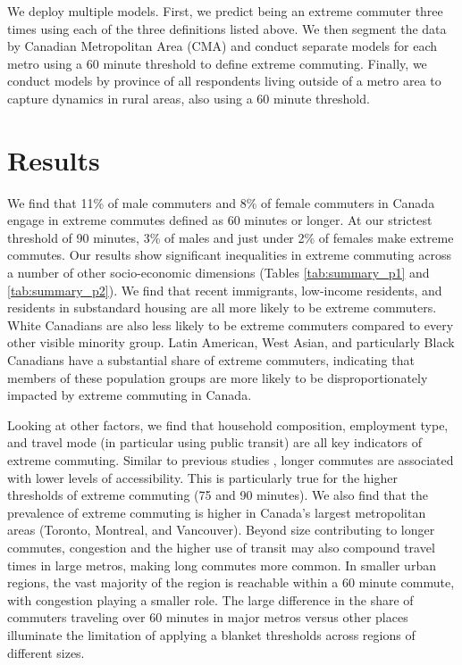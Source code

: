 \documentclass[10 pt,letterpaper]{article}
\begin{document}
We deploy multiple models. First, we predict being an extreme commuter three times using each of the three definitions listed above. We then segment the data by Canadian Metropolitan Area (CMA) and conduct separate models for each metro using a 60 minute threshold to define extreme commuting. Finally, we conduct models by province of all respondents living outside of a metro area to capture dynamics in rural areas, also using a 60 minute threshold.



\section{Results}

We find that 11\% of male commuters and 8\% of female commuters in Canada engage in extreme commutes defined as 60 minutes or longer. At our strictest threshold of 90 minutes, 3\% of males and just under 2\% of females make extreme commutes. Our results show significant inequalities in extreme commuting across a number of other socio-economic dimensions (Tables \ref{tab:summary_p1} and \ref{tab:summary_p2}). We find that recent immigrants, low-income residents, and residents in substandard housing are all more likely to be extreme commuters. White Canadians are also less likely to be extreme commuters compared to every other visible minority group. Latin American, West Asian, and particularly Black Canadians have a substantial share of extreme commuters, indicating that members of these population groups are more likely to be disproportionately impacted by extreme commuting in Canada.

Looking at other factors, we find that household composition, employment type, and travel mode (in particular using public transit) are all key indicators of extreme commuting. Similar to previous studies \cite{hu_changing_2015, cui_accessibility_2019}, longer commutes are associated with lower levels of accessibility. This is particularly true for the higher thresholds of extreme commuting (75 and 90 minutes). We also find that the prevalence of extreme commuting is higher in Canada's largest metropolitan areas (Toronto, Montreal, and Vancouver). Beyond size contributing to longer commutes, congestion and the higher use of transit may also compound travel times in large metros, making long commutes more common. In smaller urban regions, the vast majority of the region is reachable within a 60 minute commute, with congestion playing a smaller role. The large difference in the share of commuters traveling over 60 minutes in major metros versus other places illuminate the limitation of applying a blanket thresholds across regions of different sizes. 
\end{document}
